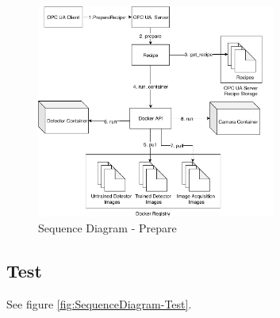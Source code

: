 \begin{figure}[ht]
	\centering
  \includegraphics[width=0.7\textwidth]{img/SequenceDiagram-Prepare.pdf}
	\caption{Sequence Diagram - Prepare}
	\label{fig:SequenceDiagram-Prepare}
\end{figure}

\subsection{Test}
See figure \ref{fig:SequenceDiagram-Test}.

